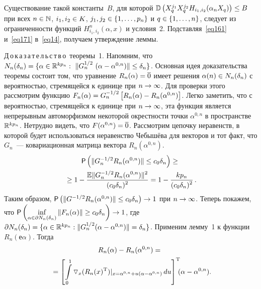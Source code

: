 \begin{multicols}{2}
Существование такой константы~$B$, для которой $\mathbb{D}\left(X_q^{j_1}X_q^{j_2}H_{i_1,i_2}
(\alpha_{n} X_q)\right)\hm\leq B$ при всех $n\hm\in \N$, $i_1,i_2\hm\in K$, 
$j_1,j_2\hm\in\{1,\ldots,p_n\}$ и $q\hm\in\{1,\ldots,n\}$, следует из ограниченности 
функций $H^n_{i_1,i_2}(\alpha,x)$ и  условия~2. 
Подставляя~\eqref{eq161} и~\eqref{eq171} в~\eqref{eq14}, получаем утверждение леммы.

\medskip

\noindent
Д\,о\,к\,а\,з\,а\,т\,е\,л\,ь\,с\,т\,в\,о\ теоремы~1.
Напомним, что $N_n(\delta_n)\hm=\{\alpha\in\R^{kp_n}:\ \|G^{1/2}_n~(\alpha\hm-\alpha^{0,n})\|\hm\leq \delta_n\}$. 
Основная идея доказательства теоремы состоит том, что уравнение $R_n(\alpha)\hm=\overline{0}$ имеет решения 
$\alpha(n)\hm\in N_n(\delta_n)$  с вероятностью, стремящейся к единице при $n\hm\rightarrow\infty$. 
Для проверки этого рассмотрим функцию $F_n(\alpha)\hm=G_n^{-1/2}\left[R_n(\alpha)\hm-
R_n(\alpha^{0,n})\right]$. Легко заметить, что с вероятностью, стремящейся к единице при 
$n\hm\rightarrow\infty$, эта функция является непрерывным автоморфизмом некоторой окрестности 
точки $\alpha^{0,n}$ в пространстве $\mathbb R^{kp_n}$. Нетрудно видеть, что $F(\alpha^{0,n})\hm=
\overline{0}$. Рассмотрим цепочку неравенств, в которой будет использоваться неравенство 
Чебышёва для векторов и тот факт, что $G_n$~--- ковариационная матрица вектора 
$R_n(\alpha^{0,n})$.
\begin{multline*}
\p\left(\|G_n^{-1/2}R_n(\alpha^{0,n})\|\leq c_0\delta_n\right)\geq{}\\
{}\geq 1-\fr{\E\|G_n^{-1/2}R_n(\alpha^{0,n})\|^2}{(c_0\delta_n)^2}=
1-\fr{kp_n}{(c_0\delta_n)^2}\,. %
\end{multline*}
Таким образом, $\p\left(\|G^{-1/2}R_n(\alpha^{0,n})\|\hm\leq c_0\delta_n\right)\hm\rightarrow1$ 
при $n\hm\rightarrow\infty$. Теперь покажем, что $\p\left(\inf\limits_{\alpha\in\partial 
N_n(\delta_n)}\|F_n(\alpha)\|\hm\geq c_0\delta_n\right)\hm\rightarrow1$, где 
$\partial N_n(\delta_n)\hm=\{\alpha\in\R^{kp_n}:\|G^{1/2}_n(\alpha\hm-\alpha^{0,n})\|\hm= 
\delta_n\}$.  Применим лемму~1 к функции $R_n(е\alpha)$. Тогда
\begin{multline*}
R_n(\alpha)-R_n(\alpha^{0,n})={}\\
{}=\left[\int\limits_{0}^{1}\triangledown_{x} 
(R_n(x)^{\mathrm{T}})|_{x=\alpha^{0,n}+u(\alpha-\alpha^{0,n})}\,{du}\right]^{\mathrm{T}}
\!\!\!(\alpha-\alpha^{0,n}).\hspace*{-2.51587pt}
\end{multline*}


\end{multicols}
